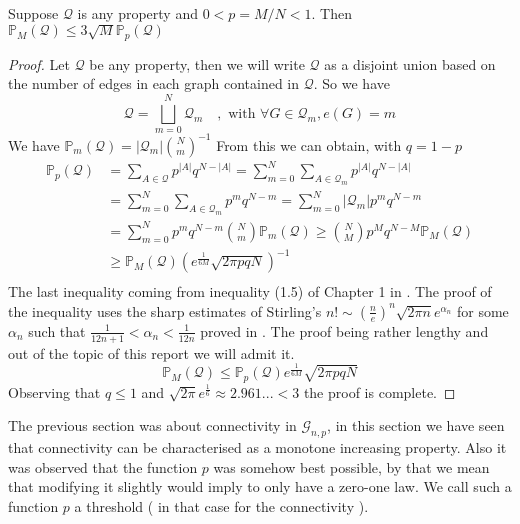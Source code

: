 \begin{theorem}\label{th:linkMP}
	Suppose $\mathcal{Q}$ is any property and $0 < p = M/N< 1$. 
	\newline
	Then $\mathbb{P}_M(\mathcal{Q}) \leq 3 \sqrt{M}\mathbb{P}_p(\mathcal{Q})$
\end{theorem}
\begin{proof}
	Let $\mathcal{Q}$ be any property, then we will write $\mathcal{Q}$ as a disjoint union based on the number of edges in each graph contained in $\mathcal{Q}$.
	\newline
	So we have
	$$\mathcal{Q} = \bigsqcup_{m=0}^{N} \mathcal{Q}_m \quad, \text{ with } \forall G \in \mathcal{Q}_m, e(G) = m$$
	We have $\mathbb{P}_m(\mathcal{Q}) = |\mathcal{Q}_m| \binom{N}{m}^{-1}$
	From this we can obtain, with $q = 1 - p$
	\begin{align*}
		\mathbb{P}_p(\mathcal{Q})	&= \sum_{A \in \mathcal{Q}} p^{|A|}q^{N-|A|}
						= \sum_{m=0}^{N}\sum_{A \in \mathcal{Q}_m} p^{|A|}q^{N-|A|}\\
						&= \sum_{m=0}^{N}\sum_{A \in \mathcal{Q}_m} p^{m}q^{N-m}
						= \sum_{m=0}^{N}|\mathcal{Q}_m|p^{m}q^{N-m}\\
						&= \sum_{m=0}^N p^mq^{N-m}\binom{N}{m}\mathbb{P}_m(\mathcal{Q}) 
						\geq \binom{N}{M}p^Mq^{N-M}\mathbb{P}_M(\mathcal{Q}) \\
						&\geq \mathbb{P}_M(\mathcal{Q})(e^{\frac{1}{6M}}\sqrt{2\pi p q N})^{-1}\\
	\end{align*}
	The last inequality coming from inequality (1.5) of Chapter 1 in \cite{Bollob01}. The proof of the inequality uses the sharp estimates of Stirling's $n! \sim (\frac{n}{e})^n\sqrt{2\pi n}e^{\alpha_n}$ for some $\alpha_n$ such that $\frac{1}{12n + 1} <\alpha_n < \frac{1}{12n}$ proved in \cite{Robins55}. 
	The proof being rather lengthy and out of the topic of this report we will admit it.
	\begin{equation}
		\mathbb{P}_M(\mathcal{Q}) \leq  \mathbb{P}_p(\mathcal{Q})e^{\frac{1}{6M}}\sqrt{2\pi pq N}
	\end{equation}
	Observing that $q \leq 1$ and $\sqrt{2\pi}e^{\frac{1}{6}} \approx 2.961... < 3$ the proof is complete.
\end{proof}
The previous section was about connectivity in $\mathcal{G}_{n,p}$, in this section we have seen that connectivity can be characterised as a monotone increasing property.
Also it was observed that the function $p$ was somehow best possible, by that we mean that modifying it slightly would imply to only have a zero-one law. 
We call such a function $p$ a threshold ( in that case for the connectivity ). 
\newline

